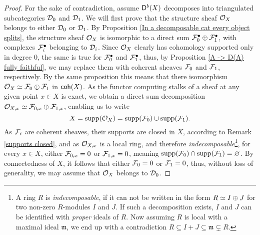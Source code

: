 \begin{proof}
    For the sake of contradiction, assume $\mathsf{D}^b(X)$ decomposes into triangulated subcategories $\mathcal D_0$ and $\mathcal D_1$. We will first prove that the structure sheaf ${\mathcal{O}_{X}}$ belongs to either $\mathcal D_0$ or $\mathcal D_1$.
    By Proposition \ref{In a decomposable cat every object splits}, the  structure sheaf ${\mathcal{O}_{X}}$ is isomorphic to a direct sum $\mathcal F_0^\bullet \oplus \mathcal F_1^\bullet$, with complexes $\mathcal F_i^\bullet$ belonging to $\mathcal D_i$.
    Since ${\mathcal{O}_{X}}$ clearly has cohomology supported only in degree $0$, the same is true for $\mathcal F_0^\bullet$ and $\mathcal F_1^\bullet$, thus, by Proposition \ref{A -> D(A) fully faithful}, we may replace them with coherent sheaves $\mathcal F_0$ and $\mathcal F_1$, respectively. By the same proposition this means that there isomorphism ${\mathcal{O}_{X}} \simeq \mathcal F_0 \oplus \mathcal F_1$ in $\mathsf{coh}(X)$. As the functor computing stalks of a sheaf at any given point $x \in X$ is exact, we obtain a direct sum decomposition $\mathcal O_{X,x} \simeq \mathcal F_{0,x} \oplus \mathcal F_{1,x}$, enabling us to write
    \[
        X = \operatorname{supp}({\mathcal{O}_{X}}) = \operatorname{supp}(\mathcal F_0) \cup \operatorname{supp}(\mathcal F_1).
    \]
    As $\mathcal F_i$ are coherent sheaves, their supports are closed in $X$, according to Remark \ref{supports closed}, and as $\mathcal O_{X,x}$ is a local ring, and therefore \emph{indecomposable}\footnote{
        A ring $R$ is \emph{indecomposable}, if it can not be written in the form $R \simeq I \oplus J$ for two non-zero $R$-modules $I$ and $J$. If such a decomposition exists, $I$ and $J$ can be identified with \emph{proper} ideals of $R$. Now assuming $R$ is local with a maximal ideal $\mathfrak{m}$, we end up with a contradiction $R \subseteq I + J \subseteq \mathfrak{m} \subsetneq R$.
    }, for every $x \in X$, either $\mathcal F_{0,x} = 0$ or $\mathcal F_{1,x} = 0$, meaning $\operatorname{supp}(\mathcal F_0) \cap \operatorname{supp}(\mathcal F_1) = \varnothing$. By connectedness of $X$, it follows that either $\mathcal F_0 = 0$ or $\mathcal F_1 = 0$, thus, without loss of generality, we may assume that ${\mathcal{O}_{X}}$ belongs to $\mathcal D_0$. 


\end{proof}
